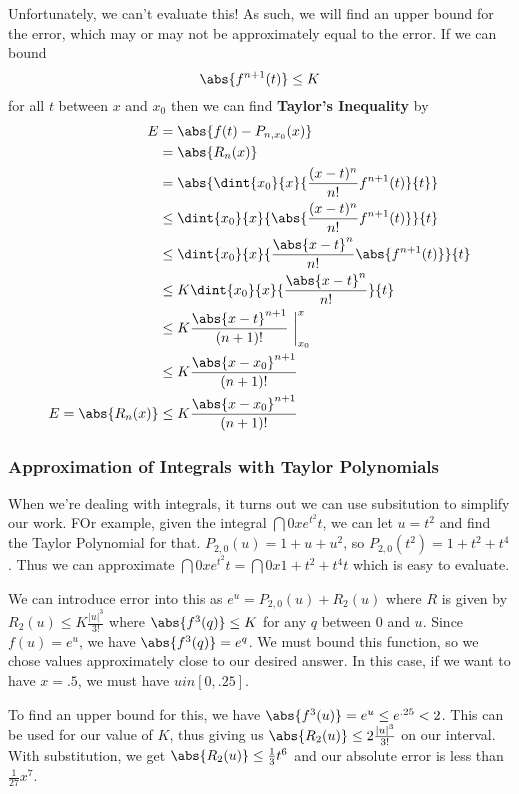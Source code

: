 \documentclass[12pt]{article}
\begin{document}
Unfortunately, we can't evaluate this! As such, we will find an upper bound for the error, which may or may not be approximately equal to the error. If we can bound \[ \abs{f^{n+1}(t)} \leq K \] for all $t$ between $x$ and $x_0$ then we can find {\bf Taylor's Inequality} by
\begin{align*}
E &= \abs{f(t) - P_{n,x_0}(x)}\\
  &= \abs{R_n(x)}\\
  &= \abs{\dint{x_0}{x}{\frac{(x-t)^n}{n!}f^{n+1}(t)}{t}}\\
  &\leq \dint{x_0}{x}{\abs{\frac{(x-t)^n}{n!}f^{n+1}(t)}}{t}\\
  &\leq \dint{x_0}{x}{\frac{\abs{x-t}^n}{n!}\abs{f^{n+1}(t)}}{t}\\
  &\leq K\dint{x_0}{x}{\frac{\abs{x-t}^n}{n!}}{t}\\
  &\leq K\frac{\abs{x-t}^{n+1}}{(n+1)!}\ \bigg|_{x_0}^x\\
  &\leq K\frac{\abs{x-x_0}^{n+1}}{(n+1)!}\\
E = \abs{R_n(x)} &\leq K\frac{\abs{x-x_0}^{n+1}}{(n+1)!}
\end{align*}

\subsubsection*{Approximation of Integrals with Taylor Polynomials}
When we're dealing with integrals, it turns out we can use subsitution to simplify our work. FOr example, given the integral $\dint{0}{x}{e^{t^2}}{t}$, we can let $u = t^2$ and find the Taylor Polynomial for that. $P_{2,0} (u) = 1 + u + u^2$, so $P_{2,0}(t^2) = 1 + t^2 + t^4$. Thus we can approximate $\dint{0}{x}{e^{t^2}}{t} = \dint{0}{x}{1 + t^2 + t^4}{t}$ which is easy to evaluate.

We can introduce error into this as $e^u = P_{2,0}(u) + R_2(u)$ where $R$ is given by $R_2(u) \leq K \frac{|u|^3}{3!}$ where $\abs{f^3(q)} \leq K$ for any $q$ between 0 and $u$.  Since $f(u) = e^u$, we have $\abs{f^3(q)} = e^q$. We must bound this function, so we chose values approximately close to our desired answer. In this case, if we want to have $x = .5$, we must have $u in [0, .25]$.

To find an upper bound for this, we have $\abs{f^3(u)} = e^u \leq e^{.25} < 2$. This can be used for our value of $K$, thus giving us $\abs{R_2(u)} \leq 2\frac{|u|^3}{3!}$ on our interval. With substitution, we get $\abs{R_2(u)} \leq \frac{1}{3}t^6$ and our absolute error is less than $\frac{1}{27}x^7$.
\end{document}
